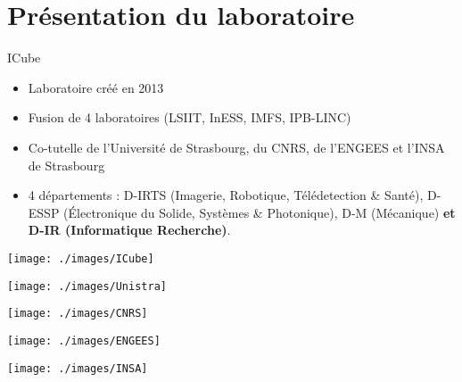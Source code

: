 \documentclass[5pt, compress]{beamer}
\makeatletter
\newcommand*{\currentname}{\@currentlabelname}
\makeatother
\begin{document}
\section{Présentation du laboratoire}
    \begin{frame}{\currentname}
        \begin{block}{ICube}
            \begin{itemize}
                \item Laboratoire créé en 2013
                \item Fusion de 4 laboratoires (LSIIT, InESS, IMFS, IPB-LINC)
                \item Co-tutelle de l'Université de Strasbourg, du CNRS, de l'ENGEES
                    et l'INSA de Strasbourg
                \item 4 départements : 
                    D-IRTS (Imagerie, Robotique, Télédetection \& Santé),
                    D-ESSP (Électronique du Solide, Systèmes \& Photonique), D-M (Mécanique)
                    \textbf{et D-IR (Informatique Recherche)}.
            \end{itemize}
        \end{block}
        \begin{minipage}{0.19\linewidth}
            \center
        \texttt{[image: ./images/ICube]}
        \end{minipage} \hfill
        \begin{minipage}{0.19\linewidth}
            \center
        \texttt{[image: ./images/Unistra]}
        \end{minipage} \hfill
        \begin{minipage}{0.19\linewidth}
            \center
        \texttt{[image: ./images/CNRS]}
        \end{minipage} \hfill
        \begin{minipage}{0.19\linewidth}
            \center
        \texttt{[image: ./images/ENGEES]}
        \end{minipage} \hfill
        \begin{minipage}{0.19\linewidth}
            \center
        \texttt{[image: ./images/INSA]}
        \end{minipage}
    \end{frame}
\end{document}
